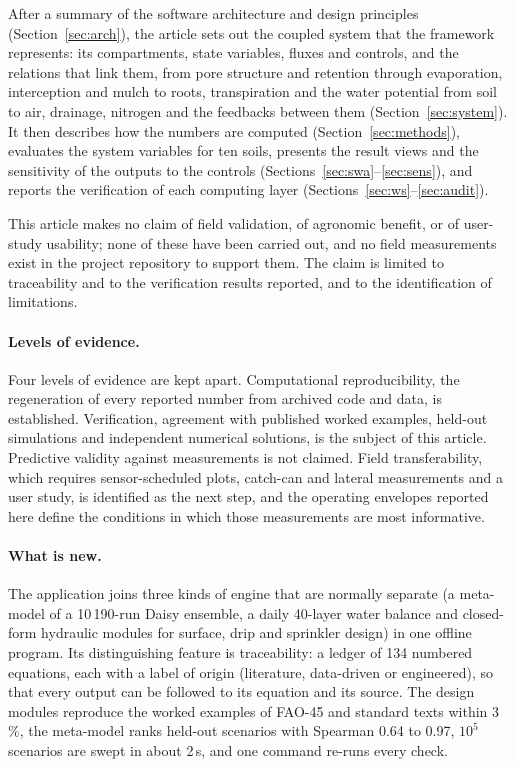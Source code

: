 \documentclass[preprint,12pt]{elsarticle}
\begin{document}
After a summary of the software architecture and design principles (Section~\ref{sec:arch}), the article sets out the coupled system that the framework represents: its compartments, state variables, fluxes and controls, and the relations that link them, from pore structure and retention through evaporation, interception and mulch to roots, transpiration and the water potential from soil to air, drainage, nitrogen and the feedbacks between them (Section~\ref{sec:system}). It then describes how the numbers are computed (Section~\ref{sec:methods}), evaluates the system variables for ten soils, presents the result views and the sensitivity of the outputs to the controls (Sections~\ref{sec:swa}--\ref{sec:sens}), and reports the verification of each computing layer (Sections~\ref{sec:ws}--\ref{sec:audit}).

This article makes no claim of field validation, of agronomic benefit, or of user-study usability; none of these have been carried out, and no field measurements exist in the project repository to support them. The claim is limited to traceability and to the verification results reported, and to the identification of limitations.

\paragraph{Levels of evidence.} Four levels of evidence are kept apart. Computational reproducibility, the regeneration of every reported number from archived code and data, is established. Verification, agreement with published worked examples, held-out simulations and independent numerical solutions, is the subject of this article. Predictive validity against measurements is not claimed. Field transferability, which requires sensor-scheduled plots, catch-can and lateral measurements and a user study, is identified as the next step, and the operating envelopes reported here define the conditions in which those measurements are most informative.

\paragraph{What is new.} The application joins three kinds of engine that are normally separate (a meta-model of a 10\,190-run Daisy ensemble, a daily 40-layer water balance and closed-form hydraulic modules for surface, drip and sprinkler design) in one offline program. Its distinguishing feature is traceability: a ledger of 134 numbered equations, each with a label of origin (literature, data-driven or engineered), so that every output can be followed to its equation and its source. The design modules reproduce the worked examples of FAO-45 and standard texts within 3\,\%, the meta-model ranks held-out scenarios with Spearman 0.64 to 0.97, $10^5$ scenarios are swept in about 2\,s, and one command re-runs every check.
\end{document}

